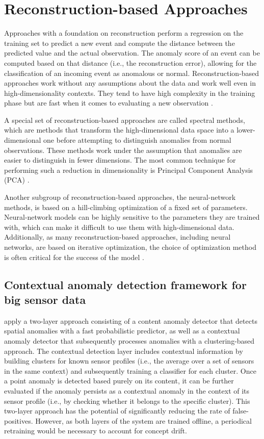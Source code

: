 \section{Reconstruction-based Approaches}
Approaches with a foundation on reconstruction perform a regression on the training set to predict a new event and compute the distance between the predicted value and the actual observation. The anomaly score of an event can be computed based on that distance (i.e., the reconstruction error), allowing for the classification of an incoming event as anomalous or normal. Reconstruction-based approaches work without any assumptions about the data and work well even in high-dimensionality contexts. They tend to have high complexity in the training phase but are fast when it comes to evaluating a new observation \citep{pimentel_review_2014}.

A special set of reconstruction-based approaches are called spectral methods, which are methods that transform the high-dimensional data space into a lower-dimensional one before attempting to distinguish anomalies from normal observations. These methods work under the assumption that anomalies are easier to distinguish in fewer dimensions. The most common technique for performing such a reduction in dimensionality is Principal Component Analysis (PCA) \citep{pimentel_review_2014}.

Another subgroup of reconstruction-based approaches, the neural-network methods, is based on a hill-climbing optimization of a fixed set of parameters. Neural-network models can be highly sensitive to the parameters they are trained with, which can make it difficult to use them with high-dimensional data. Additionally, as many reconstruction-based approaches, including neural networks, are based on iterative optimization, the choice of optimization method is often critical for the success of the model \citep{kanarachos_detecting_2017}.


\subsection{Contextual anomaly detection framework for big sensor data \citep{hayes_contextual_2015}}
\citet{hayes_contextual_2015} apply a two-layer approach consisting of a content anomaly detector that detects spatial anomalies with a fast probabilistic predictor, as well as a contextual anomaly detector that subsequently processes anomalies with a clustering-based approach. The contextual detection layer includes contextual information by building clusters for known sensor profiles (i.e., the average over a set of sensors in the same context) and subsequently training a classifier for each cluster. Once a point anomaly is detected based purely on its content, it can be further evaluated if the anomaly persists as a contextual anomaly in the context of its sensor profile (i.e., by checking whether it belongs to the specific cluster). This two-layer approach has the potential of significantly reducing the rate of false-positives. However, as both layers of the system are trained offline, a periodical retraining would be necessary to account for concept drift.


